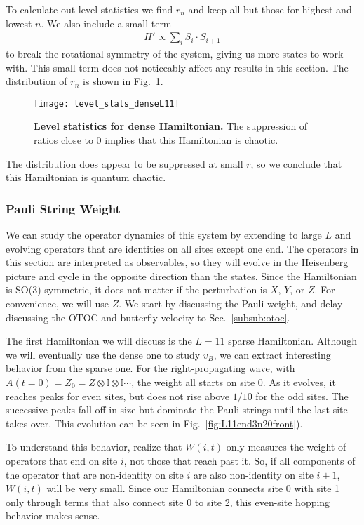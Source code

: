 To calculate out level statistics we find $r_n$ and keep all but those for highest and lowest $n$. We also include a small term  
\begin{align}
H'\propto\sum_i S_i\cdot S_{i+1}
\end{align}
to break the rotational symmetry of the system, giving us more states to work with. This small term does not noticeably affect any results in this section. The distribution of $r_n$ is shown in Fig.~\ref{fig:level_stats_denseL11}.
\begin{figure}
	\centering
	\texttt{[image: level\_stats\_denseL11]}
	\caption{\textbf{Level statistics for dense Hamiltonian.} The suppression of ratios close to 0 implies that this Hamiltonian is chaotic.}
	\label{fig:level_stats_denseL11}
\end{figure}
The distribution does appear to be suppressed at small $r$, so we conclude that this Hamiltonian is quantum chaotic.

\subsubsection{Pauli String Weight} \label{subsub:pauli}  

We can study the operator dynamics of this system by extending to large $L$ and evolving operators that are identities on all sites except one end. The operators in this section are interpreted as observables, so they will evolve in the Heisenberg picture and cycle in the opposite direction than the states. Since the Hamiltonian is SO(3) symmetric, it does not matter if the perturbation is $X$, $Y$, or $Z$. For convenience, we will use $Z$. We start by discussing the Pauli weight, and delay discussing the OTOC and butterfly velocity to Sec.~\ref{subsub:otoc}.

The first Hamiltonian we will discuss is the $L=11$ sparse Hamiltonian. Although we will eventually use the dense one to study $v_B$, we can extract interesting behavior from the sparse one.
For the right-propagating wave, with $A(t=0) = Z_0 = Z\otimes \mathbb{I} \otimes \mathbb{I} \cdots$, the weight all starts on site 0. As it evolves, it reaches peaks for even sites, but does not rise above $1/10$ for the odd sites. The successive peaks fall off in size but dominate the Pauli strings until the last site takes over. This evolution can be seen in Fig.~\ref{fig:L11end3n20front}). 

To understand this behavior, realize that $W(i,t)$ only measures the weight of operators that end on site $i$, not those that reach past it. So, if all components of the operator that are non-identity on site $i$ are also non-identity on site $i+1$, $W(i,t)$ will be very small. Since our Hamiltonian connects site 0 with site 1 only through terms that also connect site 0 to site 2, this even-site hopping behavior makes sense. 

